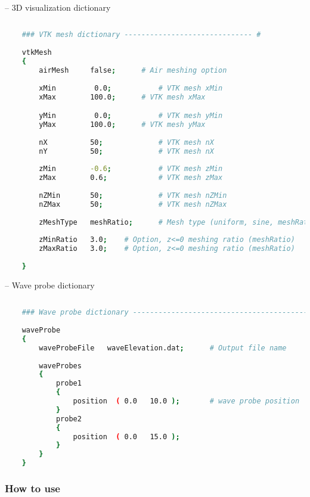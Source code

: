 	-- 3D visualization dictionary
	
	\begin{lstlisting}[language=bash]
	
	### VTK mesh dictionary ------------------------------ #
	
	vtkMesh
	{
		airMesh		false;		# Air meshing option 
		
		xMin		 0.0;			# VTK mesh xMin
		xMax		100.0;		# VTK mesh xMax

		yMin		 0.0;			# VTK mesh yMin
		yMax		100.0;		# VTK mesh yMax		
		
		nX			50;				# VTK mesh nX
		nY			50;				# VTK mesh nX
		
		zMin		-0.6;			# VTK mesh zMin		
		zMax		0.6;			# VTK mesh zMax
		
		nZMin		50;				# VTK mesh nZMin
		nZMax		50;				# VTK mesh nZMax
		
		zMeshType	meshRatio;		# Mesh type (uniform, sine, meshRatio)
		
		zMinRatio	3.0;	# Option, z<=0 meshing ratio (meshRatio)
		zMaxRatio	3.0;	# Option, z<=0 meshing ratio (meshRatio)
		
	}
	\end{lstlisting}
	
	\pagebreak
	
	-- Wave probe dictionary
	
	\begin{lstlisting}[language=bash]
	
	### Wave probe dictionary ------------------------------------------ #
	
	waveProbe
	{
		waveProbeFile	waveElevation.dat;		# Output file name
		
		waveProbes
		{
			probe1
			{
				position  ( 0.0   10.0 );		# wave probe position
			}			
			probe2
			{
				position  ( 0.0   15.0 );
			}			
		}
	}
	\end{lstlisting}
	
	\subsubsection{How to use}
	
	\vspace{0.5cm}
	
